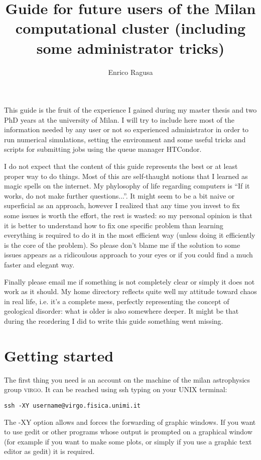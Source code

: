 \documentclass[10pt,a4paper,twoside]{article} %
\title{Guide for future users of the Milan computational cluster (including some administrator tricks)}
\author{Enrico Ragusa}
\begin{document}
\maketitle

This guide is the fruit of the experience I gained during my master thesis and two PhD years at the university of Milan. I will try to include here most of the information needed by any user or not so experienced administrator in order to run numerical simulations, setting the environment and some useful tricks and scripts for submitting jobs using the queue manager HTCondor. 

I do not expect that the content of this guide represents the best or at least proper way to do things. Most of this are self-thaught notions that I learned as magic spells on the internet. My phylosophy of life regarding computers is ``If it works, do not make further questions...''. It might seem to be a bit naive or superficial as an approach, however I realized that any time you invest to fix some issues is worth the effort, the rest is wasted: so my personal opinion is that it is better to understand how to fix one specific problem than learning everything is required to do it in the most efficient way (unless doing it efficiently is the core of the problem). So please don't blame me if the solution to some issues appears as a ridicoulous approach to your eyes or if you could find a much faster and elegant way.

Finally please email me if something is not completely clear or simply it does not work as it should. My home directory reflects quite well my attitude toward chaos in real life, i.e. it's a complete mess, perfectly representing the concept of geological disorder: what is older is also somewhere deeper. It might be that during the reordering I did to write this guide something went missing.  

\section{Getting started}

The first thing you need is an account on the machine of the milan astrophysics group \textsc{virgo}. It can be reached using ssh typing on your UNIX terminal:
\begin{verbatim}
ssh -XY username@virgo.fisica.unimi.it
\end{verbatim}
The -XY option allows and forces the forwarding of graphic windows. If you want to use gedit or other programs whose output is prompted on a graphical window (for example if you want to make some plots, or simply if you use a graphic text editor as gedit) it is required. 
\end{document}
